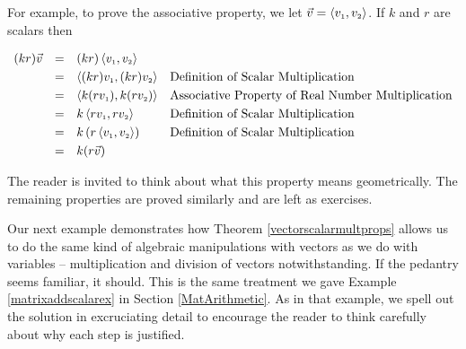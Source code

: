 \documentclass{ximera}
\begin{document}
\smallskip

For example, to prove the associative property, we let $\vec{v} = \left<v_{\mbox{\tiny $1$}},v_{\mbox{\tiny $2$}}\right>$.  If $k$ and $r$ are scalars then 

\[\begin{array}{rcll}

(kr) \vec{v} & = & (kr) \left<v_{\mbox{\tiny $1$}},v_{\mbox{\tiny $2$}}\right> & \\ [3pt]
						 & = &  \left<(kr) v_{\mbox{\tiny $1$}}, (kr) v_{\mbox{\tiny $2$}}\right> & \text{Definition of Scalar Multiplication} \\ [3pt]
						 & = &   \left<k (r v_{\mbox{\tiny $1$}}),  k (r v_{\mbox{\tiny $2$}})\right> & \text{Associative Property of Real Number Multiplication} \\ [3pt]
						 & = &   k\left<r v_{\mbox{\tiny $1$}},  r v_{\mbox{\tiny $2$}}\right> & \text{Definition of Scalar Multiplication} \\ [3pt]	
 						 & = &   k\left(r\left<v_{\mbox{\tiny $1$}}, v_{\mbox{\tiny $2$}}\right>\right) & \text{Definition of Scalar Multiplication} \\ [3pt]
						 & = & k(r\vec{v}) & \\ \end{array} \]
						 
The reader is invited to think about what this property means geometrically.  The remaining properties are proved similarly and are left as exercises.

\smallskip

Our next example demonstrates how Theorem \ref{vectorscalarmultprops} allows us to do the same kind of algebraic manipulations with vectors as we do with variables -- multiplication and division of vectors notwithstanding.  If the pedantry seems familiar, it should.  This is the same treatment we gave Example \ref{matrixaddscalarex} in Section \ref{MatArithmetic}.  As in that example,  we spell out the solution in excruciating detail to encourage the reader to think carefully about why each step is justified.
\end{document}
